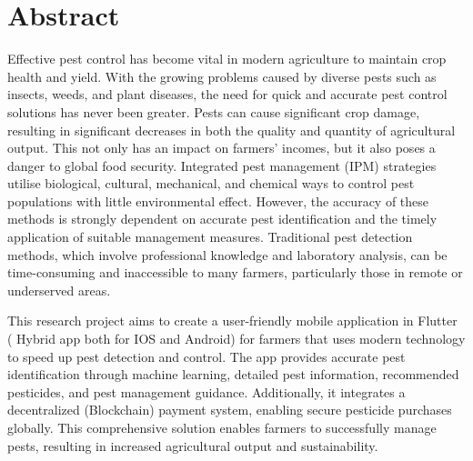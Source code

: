 \chapter*{\Large \center Abstract}

Effective pest control has become vital in modern agriculture to maintain crop health and yield. With the growing problems caused by diverse pests such as insects, weeds, and plant diseases, the need for quick and accurate pest control solutions has never been greater. Pests can cause significant crop damage, resulting in significant decreases in both the quality and quantity of agricultural output. This not only has an impact on farmers' incomes, but it also poses a danger to global food security.
Integrated pest management (IPM) strategies utilise biological, cultural, mechanical, and chemical ways to control pest populations with little environmental effect. However, the accuracy of these methods is strongly dependent on accurate pest identification and the timely application of suitable management measures. Traditional pest detection methods, which involve professional knowledge and laboratory analysis, can be time-consuming and inaccessible to many farmers, particularly those in remote or underserved areas.

This research project aims to create a user-friendly mobile application in Flutter ( Hybrid app both for IOS and Android) for farmers that uses modern technology to speed up pest detection and control. The app provides accurate pest identification through machine learning, detailed pest information, recommended pesticides, and pest management guidance. Additionally, it integrates a decentralized (Blockchain) payment system, enabling secure pesticide purchases globally. This comprehensive solution enables farmers to successfully manage pests, resulting in increased agricultural output and sustainability.

